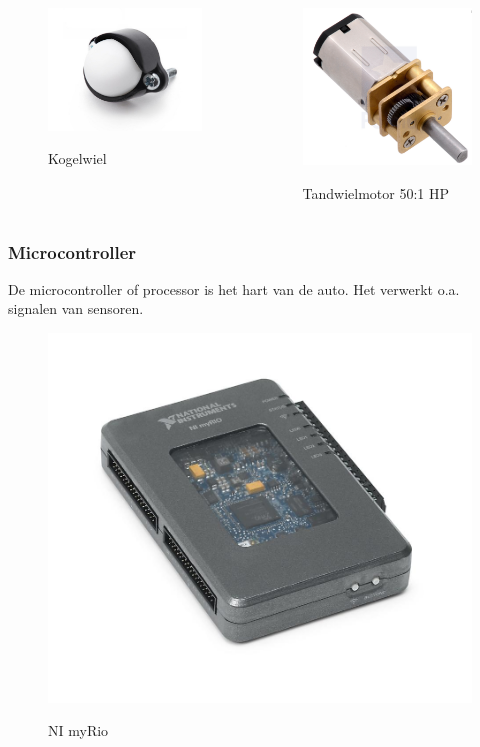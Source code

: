 \documentclass
   [kulak,aspectratio=169,<options>] %
   {kulakbeamer}
\begin{document}
\begin{frame}
\begin{columns}
\begin{figure}
			\centering
			\includegraphics[width=.7\textwidth]{ballcaster}
			\caption{\scriptsize Kogelwiel}\cite{BallCaster}
		\end{figure}
		\begin{figure}
			\centering
			\includegraphics[width=.6\textwidth]{gear}
			\caption{\scriptsize Tandwielmotor 50:1 HP}\cite{MicroMetalGearMotor50:1HP}
		\end{figure}
	\end{columns}
\end{frame}

\begin{frame}
	\frametitle{Microcontroller}
	De microcontroller of processor is het hart van de auto. Het verwerkt o.a. signalen van sensoren.
		\begin{figure}
			\centering
			\includegraphics[width=.3\textwidth]{NI-myrio}
			\caption{NI myRio}\cite{nimyrio}
		\end{figure}
\end{frame}
\end{document}
